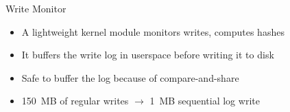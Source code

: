 \documentclass[usepdftitle=false,hyperref={pdfpagelabels=false},t]{beamer}
\makeatletter
\newcommand\myrightarrow{\tikz \node[draw=red,fill=yellow,
  shape=single arrow,minimum height=1cm,scale=0.33] {};
  {}}
\newenvironment{steps}{%
  \bgroup
  \def\steps@indent{}%
  \def\steps@arrow{}%
  \newcommand<>{\step}[1]{%
    \onslide##2{\steps@indent\steps@arrow ##1}%
    \xdef\steps@indent{\quad\steps@indent}%
    \gdef\steps@arrow{\myrightarrow} \\%
  }%
  \begin{tabular}{l}%
}{%
  \end{tabular}%
  \egroup
}
\makeatother
\begin{document}
\begin{frame}{Write Monitor}
\begin{center}
    \vspace{1em}
    \begin{itemize}
      \item<2-> A lightweight kernel module monitors writes,
        computes hashes
      \item<3-> It buffers the write log in userspace before writing
        it to disk
      \item<5-> Safe to buffer the log because of compare-and-share
      \item<6-> 150~MB of regular writes $\rightarrow$ 1~MB sequential
        log write
    \end{itemize}
  \end{center}
\end{frame}


\end{document}
